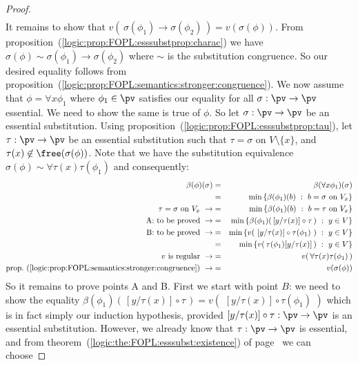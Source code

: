 \begin{proof}
\begin{eqnarray*}
    \end{eqnarray*}
It remains to show that
$v(\,\sigma(\phi_{1})\to\sigma(\phi_{2})\,)=v(\sigma(\phi))$. From
proposition~(\ref{logic:prop:FOPL:esssubstprop:charac}) we have
$\sigma(\phi)\sim\sigma(\phi_{1})\to\sigma(\phi_{2})$ where $\sim$
is the substitution congruence. So our desired equality follows from
proposition~(\ref{logic:prop:FOPL:semantics:stronger:congruence}).
We now assume that $\phi=\forall x\phi_{1}$ where $\phi_{1}\in\pv$
satisfies our equality for all $\sigma:\pv\to\pv$ essential. We need
to show the same is true of $\phi$. So let $\sigma:\pv\to\pv$ be an
essential substitution. Using
proposition~(\ref{logic:prop:FOPL:esssubstprop:tau}), let
$\tau:\pv\to\pv$ be an essential substitution such that
$\tau=\sigma$ on $V\setminus\{x\}$, and
$\tau(x)\not\in\free(\sigma(\phi))$. Note that we have the
substitution equivalence
$\sigma(\phi)\sim\forall\tau(x)\tau(\phi_{1})$ and consequently:
    \begin{eqnarray*}
    \beta(\phi)(\sigma)&=&\beta(\forall x\phi_{1})(\sigma)\\
    &=&\min\left\{\beta(\phi_{1})(b)\ :\ b=\sigma\mbox{\ on\
    }V_{x}\right\}\\
    \tau=\sigma\mbox{\ on\ }V_{x}\ \rightarrow
    &=&\min\left\{\beta(\phi_{1})(b)\ :\ b=\tau\mbox{\ on\
    }V_{x}\right\}\\
    \mbox{A: to be proved}\ \rightarrow
    &=&\min\left\{\beta(\phi_{1})(\,[y/\tau(x)]\circ\tau\,)\ :\ y\in V\right\}\\
    \mbox{B: to be proved}\ \rightarrow
    &=&\min\left\{v(\,\,[y/\tau(x)]\circ\tau(\phi_{1})\,\,)\ :\ y\in V\right\}\\
    &=&\min\left\{v(\,\tau(\phi_{1})[y/\tau(x)]\,)\ :\ y\in V\right\}\\
    \mbox{$v$ is regular}\ \rightarrow&=&v(\,\forall\tau(x)\tau(\phi_{1})\,)\\
    \mbox{prop.~(\ref{logic:prop:FOPL:semantics:stronger:congruence})}\ \rightarrow
    &=&v(\sigma(\phi))
    \end{eqnarray*}
So it remains to prove points A and B. First we start with point
$B$: we need to show the equality
$\beta(\phi_{1})(\,[y/\tau(x)]\circ\tau\,)=v(\,\,[y/\tau(x)]\circ\tau(\phi_{1})\,\,)$
which is in fact simply our induction hypothesis, provided
$[y/\tau(x)]\circ\tau:\pv\to\pv$ is an essential substitution.
However, we already know that $\tau:\pv\to\pv$ is essential, and
from theorem~(\ref{logic:the:FOPL:esssubst:existence}) of
page~\pageref{logic:the:FOPL:esssubst:existence} we can choose

\end{proof}
